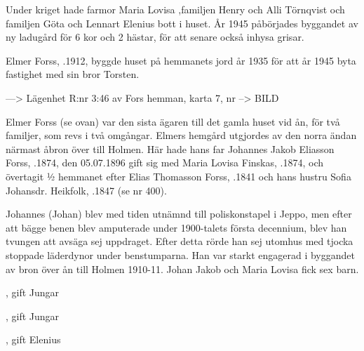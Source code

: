Under kriget hade farmor Maria Lovisa ,familjen Henry och Alli Törnqvist och familjen Göta och Lennart Elenius bott i huset. År 1945 påbörjades byggandet av ny ladugård för 6 kor och 2 hästar, för att senare också inhysa grisar.
\begin{jhchildren}
  \item {}
  \item {}
  \item {}
  \item {}
\end{jhchildren}


Elmer Forss, .1912, byggde huset på hemmanets jord år 1935 för att år 1945 byta fastighet med sin bror Torsten.


---> Lägenhet R:nr 3:46 av Fors hemman, karta 7, nr      --> BILD

Elmer Forss (se ovan) var den sista ägaren till det gamla huset vid ån, för två familjer, som revs i två omgångar. Elmers hemgård utgjordes av den norra ändan närmast åbron över till Holmen. Här hade hans far Johannes Jakob Eliasson Forss, .1874, den 05.07.1896 gift sig med Maria Lovisa Finskas, .1874, och övertagit ½ hemmanet efter Elias Thomasson Forss, .1841 och hans hustru Sofia Johansdr. Heikfolk, .1847 (se nr 400).

Johannes (Johan) blev med tiden utnämnd till poliskonstapel i Jeppo, men efter att bägge benen blev amputerade under 1900-talets första decennium, blev han tvungen att avsäga sej uppdraget. Efter detta rörde han sej utomhus med tjocka stoppade läderdynor under benstumparna. Han var starkt engagerad i byggandet av bron över ån till Holmen 1910-11.
Johan Jakob och Maria Lovisa fick sex barn.
\begin{jhchildren}
  \item {}, gift Jungar
  \item {}
  \item {}, gift Jungar
  \item {}
  \item {}
  \item {}, gift Elenius
\end{jhchildren}

